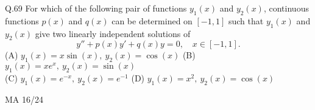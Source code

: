 \documentclass{article}
\begin{document}
																																																																																																											   Q.69 \quad For which of the following pair of functions $y_1(x)$ and $y_2(x)$, continuous functions $p(x)$ and $q(x)$ can be determined on $[-1, 1]$ such that $y_1(x)$ and $y_2(x)$ give two linearly independent solutions of
																																																																																																											   \[
																																																																																																											   y'' + p(x)y' + q(x)y = 0,\quad x \in [-1, 1].
																																																																																																											   \]
																																																																																																											   \newline \vspace{1em} 
																																																																																																											   (A) $y_1(x) = x \sin(x),\ y_2(x) = \cos(x)$ \hspace{2cm}(B) $y_1(x) = x e^x,\ y_2(x) = \sin(x)$ \hspace{2cm} \\  (C) $y_1(x) = e^{-x},\ y_2(x) = e^{-1}$ \hspace{3cm} (D) $y_1(x) = x^2,\ y_2(x) = \cos(x)$
																																																																																																											   \vspace{5em}
																																																																																																											   \begin{center}
																																																																																																											       {MA 16/24}
																																																																																																											       \end{center}
																																																																																																											       \newpage
\end{document}
